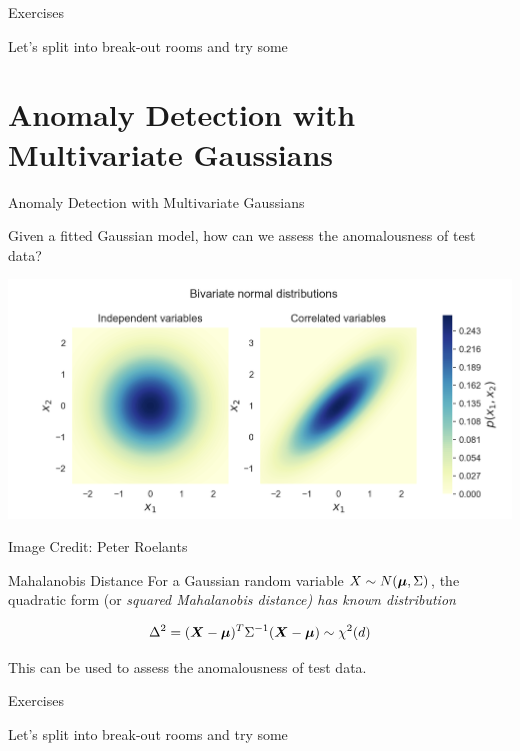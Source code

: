 \documentclass[10pt]{beamer}
\begin{document}
\begin{frame}{Exercises}

Let's split into break-out rooms and try some \href{https://colab.research.google.com/drive/1aNNOV0fdAcDiKKKGp5dodGtEA5sk96TH}{}

\end{frame}



\section{Anomaly Detection with Multivariate Gaussians}

\begin{frame}{Anomaly Detection with Multivariate Gaussians}

Given a fitted Gaussian model, how can we assess the anomalousness of test data?

\pause 
\begin{center}
\includegraphics[width=.6\textwidth]{images/gaussian_heatmap_independent_correlated}
\end{center}

\vfill
\hfill \tiny Image Credit: Peter Roelants
\pause

\begin{sblock}{Mahalanobis Distance}
\footnotesize
For a Gaussian random variable $X \sim N ({\boldsymbol \mu}, \Sigma)$,  the quadratic form (or \it{squared Mahalanobis distance}) has known distribution 

\[ \Delta^2 = ({\boldsymbol X} - {\boldsymbol \mu}) ^T \Sigma^{-1} ({\boldsymbol X} - {\boldsymbol \mu}) \sim \chi^2(d) \]

This can be used to assess the anomalousness of test data.
\end{sblock}

\end{frame}

\begin{frame}{Exercises}

Let's split into break-out rooms and try some \href{https://colab.research.google.com/drive/1tqG8H1m5TyBwtK_Rdnh9uYWMjzvJySvy}{}

\end{frame}
\end{document}
